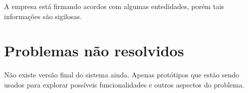A empresa está firmando acordos com algumas entedidades, porém tais informações são sigilosas.





\section{Problemas não resolvidos}

Não existe versão final do sistema ainda. Apenas protótipos que estão sendo usados para explorar possíveis funcionalidades e outros aspectos do problema.
